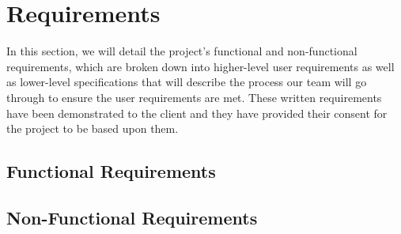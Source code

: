 \chapter{Requirements} \label{ch:requirements}

    In this section, we will detail the project's functional and non-functional requirements, which are broken down into
    higher-level user requirements as well as lower-level specifications that will describe the process our team will go
    through to ensure the user requirements are met. These written requirements have been demonstrated to the client and they have provided their consent for the project to be based upon them.

    \section{Functional Requirements} \label{sec:func_requirements}

    \vspace{1em}  \vspace{5em}

    \section{Non-Functional Requirements} \label{sec:non_func_requirements}

    \vspace{1em}  \vspace{5em}
